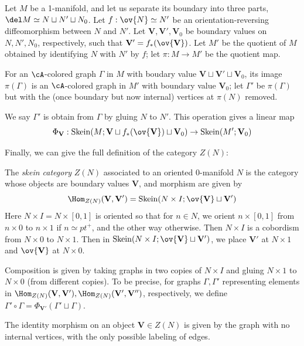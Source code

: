 \documentclass[12pt]{article}
\newcommand{\VV}{{\mathbf{V}}}
\DeclareMathOperator{\Skein}{Skein}
\begin{document}
\begin{definition}
Let $M$ be a 1-manifold,
and let us separate its boundary into three parts,
$\del M \simeq N \sqcup N' \sqcup N_0$.
Let $f: \ov{N} \simeq N'$ be an orientation-reversing
diffeomorphism between $N$ and $N'$.
Let $\VV,\VV',\VV_0$ be boundary values on $N,N',N_0$,
respectively, such that $\VV' = f_*(\ov{\VV})$.
Let $M'$ be the quotient of $M$
obtained by identifying $N$ with $N'$ by $f$;
let $\pi : M \to M'$ be the quotient map.

For an $\cA$-colored graph $\Gamma$ in $M$
with boudary value $\VV \sqcup \VV' \sqcup \VV_0$,
its image $\pi(\Gamma)$ is an $\cA$-colored graph in $M'$
with boundary value $\VV_0$;
let $\Gamma'$ be $\pi(\Gamma)$ but with
the (once boundary but now internal) vertices at
$\pi(N)$ removed.

We say $\Gamma'$ is obtain from $\Gamma$
by gluing $N$ to $N'$.
This operation gives a linear map
\[
\Phi_{\VV} :
\Skein(M;\VV \sqcup f_*(\ov{\VV}) \sqcup \VV_0)
\to \Skein(M';\VV_0)
\]
\end{definition}


Finally, we can give the full definition of the category
$Z(N)$:

\begin{definition}
\label{d:skein-category}
The \emph{skein category} $Z(N)$ associated to an
oriented 0-manifold $N$
is the category whose objects are boundary values $\VV$,
and morphism are given by
\[
\Hom_{Z(N)}(\VV,\VV') = \Skein(N \times I; \ov{\VV} \sqcup \VV')
\]
Here $N \times I = N \times [0,1]$
is oriented so that for $n \in N$,
we orient $n \times [0,1]$ from $n \times 0$
to $n \times 1$ if $n \simeq pt^+$,
and the other way otherwise.
Then $N \times I$ is a cobordism
from $N \times 0$ to $N \times 1$.
Then in $\Skein(N \times I; \ov{\VV} \sqcup \VV')$,
we place $\VV'$ at $N \times 1$
and $\ov{\VV}$ at $N \times 0$.

Composition is given by taking graphs in
two copies of $N \times I$
and gluing $N \times 1$ to $N \times 0$
(from different copies).
To be precise,
for graphs $\Gamma,\Gamma'$
representing elements in
$\Hom_{Z(N)}(\VV,\VV'), \Hom_{Z(N)}(\VV',\VV'')$,
respectively,
we define
$\Gamma' \circ \Gamma
= \Phi_{\VV'}(\Gamma' \sqcup \Gamma)$.


The identity morphism on an object $\VV \in Z(N)$
is given by the graph with no internal vertices,
with the only possible labeling of edges.
\end{definition}
\end{document}
